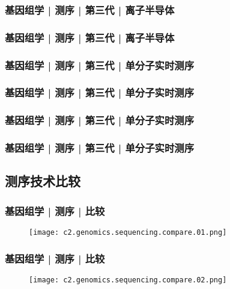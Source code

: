\begin{frame}[label=current]
  \frametitle{基因组学 | 测序 | 第三代 | 离子半导体}
\end{frame}

\begin{frame}[label=current]
  \frametitle{基因组学 | 测序 | 第三代 | 离子半导体}
\end{frame}

\begin{frame}[label=current]
  \frametitle{基因组学 | 测序 | 第三代 | 单分子实时测序}
\end{frame}

\begin{frame}[label=current]
  \frametitle{基因组学 | 测序 | 第三代 | 单分子实时测序}
\end{frame}

\begin{frame}[label=current]
  \frametitle{基因组学 | 测序 | 第三代 | 单分子实时测序}
\end{frame}

\begin{frame}[label=current]
  \frametitle{基因组学 | 测序 | 第三代 | 单分子实时测序}
\end{frame}

\subsection{测序技术比较}
\begin{frame}
  \frametitle{基因组学 | 测序 | 比较}
  \begin{figure}
    \centering
    \texttt{[image: c2.genomics.sequencing.compare.01.png]}
  \end{figure}
\end{frame}

\begin{frame}
  \frametitle{基因组学 | 测序 | 比较}
  \begin{figure}
    \centering
    \texttt{[image: c2.genomics.sequencing.compare.02.png]}
  \end{figure}
\end{frame}

